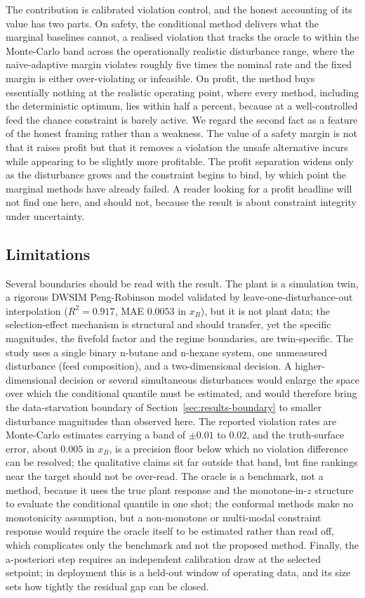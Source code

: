 The contribution is calibrated violation control, and the honest accounting of its value has two
parts. On safety, the conditional method delivers what the marginal baselines cannot, a realised
violation that tracks the oracle to within the Monte-Carlo band across the operationally
realistic disturbance range, where the naive-adaptive margin violates roughly five times the
nominal rate and the fixed margin is either over-violating or infeasible. On profit, the method
buys essentially nothing at the realistic operating point, where every method, including the
deterministic optimum, lies within half a percent, because at a well-controlled feed the chance
constraint is barely active. We regard the second fact as a feature of the honest framing rather
than a weakness. The value of a safety margin is not that it raises profit but that it removes a
violation the unsafe alternative incurs while appearing to be slightly more profitable. The
profit separation widens only as the disturbance grows and the constraint begins to bind, by
which point the marginal methods have already failed. A reader looking for a profit headline will
not find one here, and should not, because the result is about constraint integrity under
uncertainty.

\subsection{Limitations}

Several boundaries should be read with the result. The plant is a simulation twin, a rigorous
DWSIM Peng-Robinson model validated by leave-one-disturbance-out interpolation ($R^2=0.917$, MAE
$0.0053$ in $x_B$), but it is not plant data; the selection-effect mechanism is structural and
should transfer, yet the specific magnitudes, the fivefold factor and the regime boundaries, are
twin-specific. The study uses a single binary n-butane and n-hexane system, one unmeasured
disturbance (feed composition), and a two-dimensional decision. A higher-dimensional decision or
several simultaneous disturbances would enlarge the space over which the conditional quantile must
be estimated, and would therefore bring the data-starvation boundary of
Section~\ref{sec:results-boundary} to smaller disturbance magnitudes than observed here. The
reported violation rates are Monte-Carlo estimates carrying a band of $\pm0.01$ to $0.02$, and the
truth-surface error, about $0.005$ in $x_B$, is a precision floor below which no violation
difference can be resolved; the qualitative claims sit far outside that band, but fine rankings
near the target should not be over-read. The oracle is a benchmark, not a method, because it uses
the true plant response and the monotone-in-$z$ structure to evaluate the conditional quantile in
one shot; the conformal methods make no monotonicity assumption, but a non-monotone or multi-modal
constraint response would require the oracle itself to be estimated rather than read off, which
complicates only the benchmark and not the proposed method. Finally, the a-posteriori step
requires an independent calibration draw at the selected setpoint; in deployment this is a
held-out window of operating data, and its size sets how tightly the residual gap can be closed.

